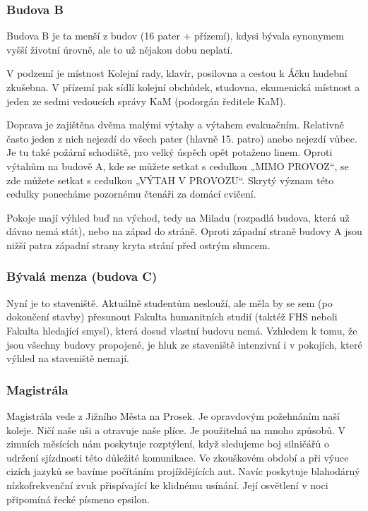 \subsubsection{Budova B}
Budova B je ta menší z budov (16 pater + přízemí), kdysi bývala synonymem vyšší
životní úrovně, ale to už nějakou dobu neplatí.

V podzemí je místnost Kolejní rady, klavír, posilovna a cestou k Áčku hudební 
zkušebna. V přízemí pak sídlí kolejní obchůdek, studovna, ekumenická místnost
 a jeden ze sedmi vedoucích správy KaM (podorgán ředitele KaM).

Doprava je zajištěna dvěma malými výtahy a výtahem evakuačním. Relativně často
jeden z nich nejezdí do všech pater (hlavně 15. patro) anebo nejezdí vůbec.
 Je tu také požární schodiště, pro velký úspěch opět potaženo linem. Oproti
výtahům na budově A, kde se můžete setkat s cedulkou
„MIMO PROVOZ“, se zde můžete setkat s cedulkou „VÝTAH V PROVOZU“. Skrytý význam
této cedulky ponecháme pozornému čtenáři za domácí cvičení.

Pokoje mají výhled buď na východ, tedy na Miladu (rozpadlá budova, která už dávno nemá stát), nebo na západ do stráně.
Oproti západní straně budovy A jsou nižší patra západní strany kryta strání před
ostrým sluncem.

\subsubsection{Bývalá menza (budova C)}
Nyní je to staveniště. Aktuálně studentům neslouží, ale měla by se sem (po dokončení
stavby) přesunout Fakulta humanitních studií (taktéž FHS neboli Fakulta
hledající smysl), která dosud vlastní budovu nemá. Vzhledem k tomu, že jsou
všechny budovy propojené, je hluk ze staveniště intenzivní i v pokojích, které
výhled na staveniště nemají.


\subsubsection{Magistrála}
Magistrála vede z Jižního Města na Prosek. Je opravdovým požehnáním naší koleje. Ničí naše
uši a otravuje naše plíce. Je použitelná na mnoho způsobů. V zimních měsících
nám poskytuje rozptýlení, když sledujeme boj silničářů o udržení sjízdnosti této
důležité komunikace. Ve zkouškovém období a při výuce cizích jazyků se bavíme
počítáním projíždějících aut. Navíc poskytuje blahodárný nízkofrekvenční zvuk
přispívající ke klidnému usínání. Její osvětlení v noci připomíná řecké písmeno
epsilon.

